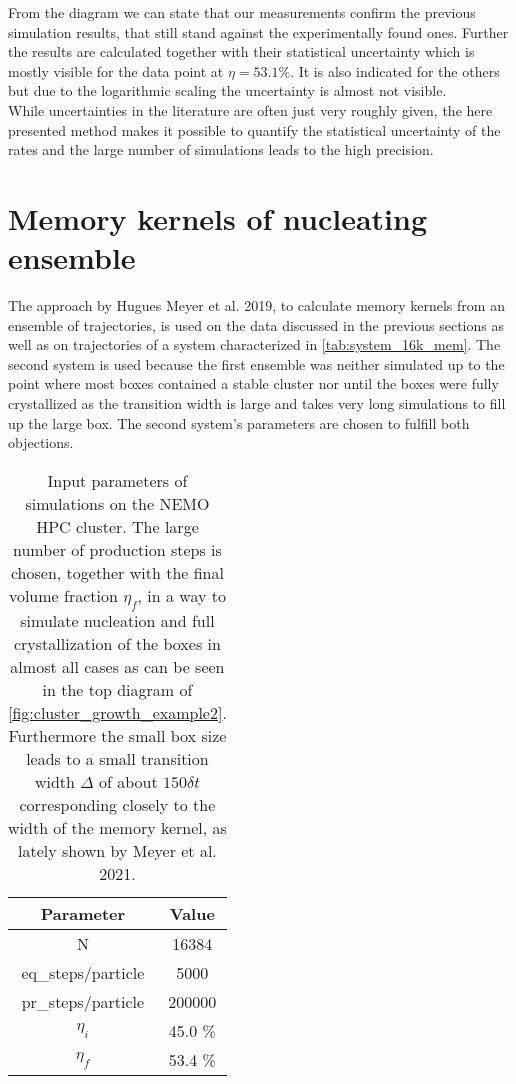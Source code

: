 From the diagram we can state that our measurements confirm the previous simulation results, that still stand against the experimentally found ones. Further the results are calculated together with their statistical uncertainty which is mostly visible for the data point at $\eta = 53.1 \%$. It is also indicated for the others but due to the logarithmic scaling the uncertainty is almost not visible.\\
While uncertainties in the literature are often just very roughly given, the here presented method makes
it possible to quantify the statistical uncertainty of the rates and the large number of simulations leads to the high precision.

\section{Memory kernels of nucleating ensemble}
\label{sec:memory_kernels}
The approach by Hugues Meyer et al. 2019\cite{Meyer2019a}, to calculate memory kernels from an ensemble of trajectories, is used on the data discussed in the previous sections as well as on trajectories of a system characterized in \autoref{tab:system_16k_mem}. The second system is used because the first ensemble was neither simulated up to the point where most boxes contained a stable cluster nor until the boxes were fully crystallized as the transition width is large and takes very long simulations to fill up the large box. The second system's parameters are chosen to fulfill both objections.\\

\begin{table}[ht]
\centering
\begin{tabular}{c|c}
Parameter & Value \\ \hline
N & 16384 \\
eq\_steps/particle & 5000 \\
pr\_steps/particle & 200000 \\
$\eta_i$ & 45.0 \% \\
$\eta_f$ & 53.4 \% \\
\end{tabular}
\caption[Simulation parameters of data production system with 16384 particles]{Input parameters of simulations on the NEMO HPC cluster. The large number of production steps is chosen, together with the final volume fraction $\eta_f$, in a way to simulate nucleation and full crystallization of the boxes in almost all cases as can be seen in the top diagram of \autoref{fig:cluster_growth_example2}. Furthermore the small box size leads to a small transition width $\Delta$ of about $150 \delta t$ corresponding closely to the width of the memory kernel, as lately shown by Meyer et al. 2021\cite{Meyer2021}.} 
\label{tab:system_16k_mem}
\end{table}

